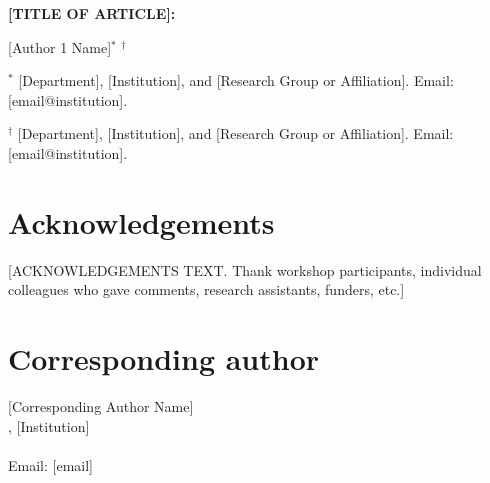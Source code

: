 \documentclass[12pt]{article}
\begin{document}
\begin{center}
{\LARGE\bfseries [TITLE OF ARTICLE]:\\
[Subtitle if any]}

\vspace{2em}

{\large [Author 1 Name]$^{\ast}$ $^{\dagger}$}

\vspace{3em}

\begin{minipage}{0.9\textwidth}
\small
$^{\ast}$ [Department], [Institution],
and [Research Group or Affiliation].
Email: [email@institution].

\vspace{0.5em}

$^{\dagger}$ [Department], [Institution],
and [Research Group or Affiliation].
Email: [email@institution].
\end{minipage}

\end{center}

\vspace{3em}

\section*{Acknowledgements}


[ACKNOWLEDGEMENTS TEXT. Thank workshop participants, individual
colleagues who gave comments, research assistants, funders, etc.]

\vspace{2em}

\section*{Corresponding author}

[Corresponding Author Name] \\
[Department], [Institution] \\
[Full postal address] \\
Email: [email]
\end{document}
